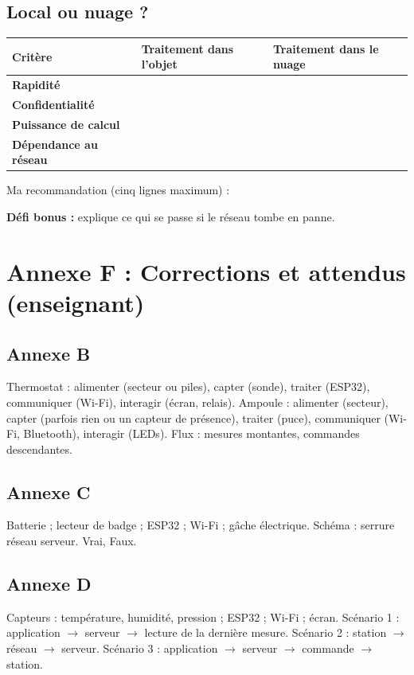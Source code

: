 \documentclass[11pt,a4paper]{article}
\begin{document}
\subsection*{Local ou nuage ?}
\begin{tabularx}{\linewidth}{>{\bfseries}p{3.4cm}Y Y}
\toprule
Critère & Traitement dans l'objet & Traitement dans le nuage\\
\midrule
Rapidité & & \\ Confidentialité & & \\ Puissance de calcul & & \\ Dépendance au réseau & & \\
\bottomrule
\end{tabularx}

Ma recommandation (cinq lignes maximum) : \lig \lig \lig

\textbf{Défi bonus :} explique ce qui se passe si le réseau tombe en panne.

\newpage
\section*{Annexe F : Corrections et attendus (enseignant)}

\subsection*{Annexe B}
Thermostat : alimenter (secteur ou piles), capter (sonde), traiter (ESP32), communiquer (Wi-Fi), interagir (écran, relais). Ampoule : alimenter (secteur), capter (parfois rien ou un capteur de présence), traiter (puce), communiquer (Wi-Fi, Bluetooth), interagir (LEDs). Flux : mesures montantes, commandes descendantes.

\subsection*{Annexe C}
Batterie ; lecteur de badge ; ESP32 ; Wi-Fi ; gâche électrique. Schéma : serrure \fl{} réseau \fl{} serveur. Vrai, Faux.

\subsection*{Annexe D}
Capteurs : température, humidité, pression ; ESP32 ; Wi-Fi ; écran. Scénario 1 : application $\to$ serveur $\to$ lecture de la dernière mesure. Scénario 2 : station $\to$ réseau $\to$ serveur. Scénario 3 : application $\to$ serveur $\to$ commande $\to$ station.
\end{document}
